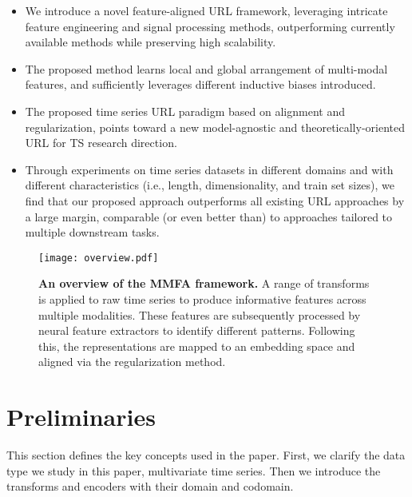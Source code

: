\documentclass{article}
\begin{document}
\begin{itemize}
\item We introduce a novel feature-aligned URL framework, leveraging intricate feature engineering and signal processing methods, outperforming currently available methods while preserving high scalability.%

\item The proposed method learns local and global arrangement of multi-modal features, and sufficiently leverages different inductive biases introduced.

\item The proposed time series URL paradigm based on alignment and regularization, points toward a new model-agnostic and theoretically-oriented URL for TS research direction.

\item Through experiments on time series datasets in different domains and with different characteristics (i.e., length, dimensionality, and train set sizes), we find that our proposed approach outperforms all existing URL approaches by a large margin, comparable (or even better than) to approaches tailored to multiple downstream tasks.
\end{itemize}


\begin{figure}[t]
\centerline{\texttt{[image: overview.pdf]}}
\caption{\textbf{An overview of the MMFA framework.} A range of transforms is applied to raw time series to produce informative features across multiple modalities. These features are subsequently processed by neural feature extractors to identify different patterns. Following this, the representations are mapped to an embedding space and aligned via the regularization method.}
\label{overview}
\end{figure}



\section{Preliminaries}


This section defines the key concepts used in the paper. First, we clarify the data type we study in this paper, multivariate time series. Then we introduce the transforms and encoders with their domain and codomain.
\end{document}

